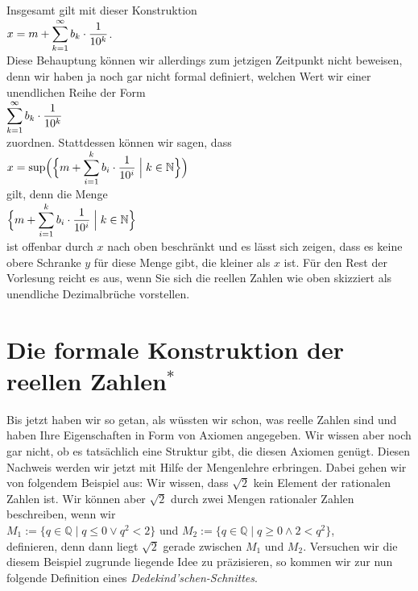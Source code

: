 Insgesamt gilt mit dieser Konstruktion
\\[0.2cm]
\hspace*{1.3cm}
$\displaystyle x = m + \sum\limits_{k=1}^{\infty} b_k \cdot \frac{1}{10^{k}}$.
\\[0.2cm]
Diese Behauptung können wir allerdings zum jetzigen Zeitpunkt nicht beweisen, denn wir haben ja noch gar nicht formal
definiert, welchen Wert wir einer unendlichen Reihe der Form
\\[0.2cm]
\hspace*{1.3cm}
$\displaystyle \sum\limits_{k=1}^{\infty} b_k \cdot \frac{1}{10^{k}}$
\\[0.2cm]
zuordnen.  Stattdessen können wir sagen, dass
\\[0.2cm]
\hspace*{1.3cm}
$\displaystyle x = \sup\Bigl(\Bigl\{ m + \sum\limits_{i=1}^{k} b_i \cdot \frac{1}{10^{i}} \Bigm| k \in \mathbb{N} \Bigr\}\Bigr)$
\\[0.2cm]
gilt, denn die Menge
\\[0.2cm]
\hspace*{1.3cm}
$\displaystyle \Bigl\{ m + \sum\limits_{i=1}^{k} b_i \cdot \frac{1}{10^{i}} \Bigm| k \in \mathbb{N} \Bigr\}$
\\[0.2cm]
ist offenbar durch $x$ nach oben beschränkt und es lässt sich zeigen, dass es keine 
obere Schranke $y$ für diese Menge gibt, die  kleiner als $x$ ist.  Für den Rest der Vorlesung
reicht es aus, wenn Sie sich die reellen Zahlen wie oben skizziert als unendliche Dezimalbrüche vorstellen.



\section{Die formale Konstruktion der reellen Zahlen$^*$}
Bis jetzt haben wir so getan, als wüssten wir schon, was reelle Zahlen sind und haben Ihre
Eigenschaften in Form von Axiomen angegeben.  Wir wissen  aber noch gar nicht, ob es tatsächlich
eine Struktur gibt, die diesen Axiomen genügt.  Diesen Nachweis werden wir jetzt mit Hilfe der
Mengenlehre erbringen.  Dabei gehen wir von folgendem Beispiel aus:  Wir wissen, dass $\sqrt{2}$
kein Element der rationalen Zahlen ist.  Wir können aber $\sqrt{2}$ durch zwei Mengen rationaler
Zahlen beschreiben, wenn wir
\\[0.2cm]
\hspace*{1.3cm}
$M_1 := \{ q \in \mathbb{Q} \mid q \leq 0 \vee q^2 < 2 \}$ \quad und \quad 
$M_2 := \{ q \in \mathbb{Q} \mid q \geq 0 \wedge 2 < q^2 \}$,
\\[0.2cm]
definieren, denn dann liegt $\sqrt{2}$ gerade zwischen $M_1$ und $M_2$.  
Versuchen wir die diesem Beispiel zugrunde liegende Idee zu präzisieren, so kommen wir zur nun
folgende Definition eines \emph{Dedekind'schen-Schnittes}.

